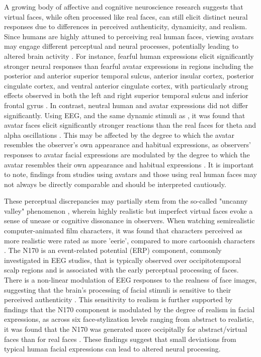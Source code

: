 A growing body of affective and cognitive neuroscience research suggests that virtual faces, while often processed like real faces, can still elicit distinct neural responses due to differences in perceived authenticity, dynamicity, and realism.
Since humans are highly attuned to perceiving real human faces, viewing avatars may engage different perceptual and neural processes, potentially leading to altered brain activity \citep{de_borst_is_2015}. 
For instance, fearful human expressions elicit significantly stronger neural responses than fearful avatar expressions in regions including the posterior and anterior superior temporal sulcus, anterior insular cortex, posterior cingulate cortex, and ventral anterior cingulate cortex, with particularly strong effects observed in both the left and right superior temporal sulcus and inferior frontal gyrus \citep{kegel_dynamic_2020}. 
In contrast, neutral human and avatar expressions did not differ significantly.
Using EEG, and the same dynamic stimuli as \cite{kegel_dynamic_2020}, it was found that avatar faces elicit significantly stronger reactions than the real faces for theta and alpha oscillations \citep{sollfrank_effects_2021}.
This may be affected by the degree to which the avatar resembles the observer's own appearance and habitual expressions, as observers' responses to avatar facial expressions are modulated by the degree to which the avatar resembles their own appearance and habitual expressions \citep{park_individuals_2021}.
It is important to note, findings from studies using avatars and those using real human faces may not always be directly comparable and should be interpreted cautiously. 

These perceptual discrepancies may partially stem from the so-called "uncanny valley" phenomenon \citep{mori_uncanny_2012}, wherein highly realistic but imperfect virtual faces evoke a sense of unease or cognitive dissonance in observers. 
When watching semirealistic computer-animated film characters, it was found that characters perceived as more realistic were rated as more 'eerie', compared to more cartoonish characters \citep{katsyri_testing_2017}. 
The N170 is an event-related potential (ERP) component, commonly investigated in EEG studies, that is typically observed over occipitotemporal scalp regions and is associated with the early perceptual processing of faces.
There is a non-linear modulation of EEG responses to the realness of face images, suggesting that the brain's processing of facial stimuli is sensitive to their perceived authenticity \citep{chen_realness_2024}.
This sensitivity to realism is further supported by findings that the N170 component is modulated by the degree of realism in facial expressions, as across six face-stylization levels ranging from abstract to realistic, it was found that the N170 was generated more occipitally for abstract/virtual faces than for real faces \citep{schindler_differential_2017}.
These findings suggest that small deviations from typical human facial expressions can lead to altered neural processing. 


